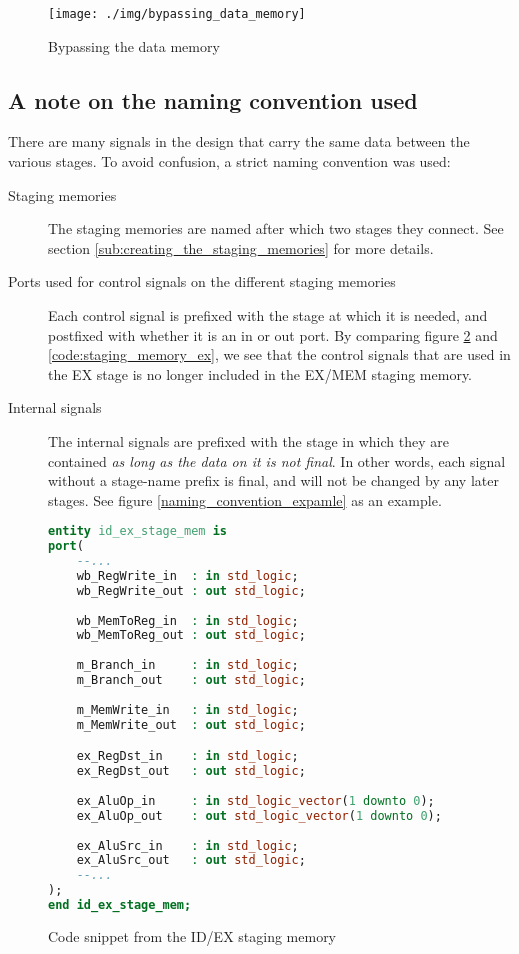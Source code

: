\begin{figure}[H]
	\texttt{[image: ./img/bypassing\_data\_memory]}
	\caption{Bypassing the data memory}
	\label{bypassing_data_memory}
\end{figure}

\subsection{A note on the naming convention used}
\label{sub:a_note_on_the_naming_convention_used}
There are many signals in the design that carry the same data between the various stages. To avoid confusion, a strict naming convention was used:

\begin{description}
	\item[Staging memories] The staging memories are named after which two stages they connect. See section \ref{sub:creating_the_staging_memories} for more details.
	\item[Ports used for control signals on the different staging memories] Each control signal is prefixed with the stage at which it is needed, and postfixed with whether it is an in or out port. By comparing figure \ref{code:staging_memory} and \ref{code:staging_memory_ex}, we see that the control signals that are used in the EX stage is no longer included in the EX/MEM staging memory. 
	\item[Internal signals] The internal signals are prefixed with the stage in which they are contained \emph{as long as the data on it is not final}. In other words, each signal without a stage-name prefix is final, and will not be changed by any later stages. See figure \ref{naming_convention_expamle} as an example.
\end{description}

\begin{figure}[H]
\begin{lstlisting}[language=VHDL]
entity id_ex_stage_mem is
port(
	--...
    wb_RegWrite_in 	: in std_logic;
    wb_RegWrite_out : out std_logic;
    
    wb_MemToReg_in  : in std_logic;
    wb_MemToReg_out : out std_logic;
    
    m_Branch_in		: in std_logic;
    m_Branch_out	: out std_logic;
    
    m_MemWrite_in	: in std_logic;
    m_MemWrite_out  : out std_logic;

    ex_RegDst_in	: in std_logic;
    ex_RegDst_out	: out std_logic;
    
    ex_AluOp_in		: in std_logic_vector(1 downto 0);
    ex_AluOp_out	: out std_logic_vector(1 downto 0);
    
    ex_AluSrc_in	: in std_logic;
    ex_AluSrc_out	: out std_logic;
	--...
);
end id_ex_stage_mem;
\end{lstlisting}
\caption{Code snippet from the ID/EX staging memory}
\label{code:staging_memory}
\end{figure}


